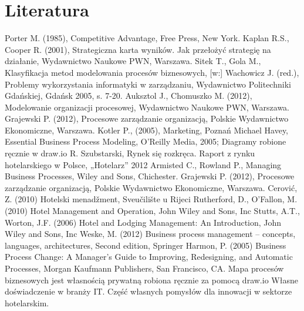 \documentclass[a4paper, 12pt]{article}
\begin{document}
\section{Literatura}
\begin{thebibliography}{}
	  Porter M. (1985), Competitive Advantage, Free Press, New York. 
	 Kaplan R.S., Cooper R. (2001), Strategiczna karta wyników. Jak przełożyć strategię na działanie, Wydawnictwo Naukowe PWN, Warszawa. 
	 Sitek  T.,  Gola  M.,  Klasyfikacja  metod  modelowania  procesów  biznesowych,  [w:] Wachowicz  J.  (red.),  Problemy  wykorzystania  informatyki  w  zarządzaniu,  Wydawnictwo Politechniki Gdańskiej, Gdańsk 2005, s. 7-20.
	 Auksztol J., Chomuszko M. (2012), Modelowanie organizacji procesowej,
Wydawnictwo Naukowe PWN, Warszawa. 
	 Grajewski P. (2012), Procesowe zarządzanie organizacją, Polskie Wydawnictwo Ekonomiczne, Warszawa. 
	 Kotler P., (2005), Marketing, Poznań
	 Michael Havey, Essential Business Process Modeling, O'Reilly Media, 2005;
	 Diagramy robione ręcznie w draw.io
	 R. Szubstarski, Rynek się rozkręca. Raport z rynku hotelarskiego w Polsce, „Hotelarz” 2012
	 Armisted C., Rowland P., Managing Business Processes, Wiley
and Sons, Chichester. 
	 Grajewski P. (2012), Procesowe zarządzanie organizacją, Polskie Wydawnictwo Ekonomiczne, Warszawa. 
	 Cerović, Z. (2010) Hotelski menadžment, Sveučilište u Rijeci
	 Rutherford, D., O’Fallon, M. (2010) Hotel Management and Operation, John Wiley and Sons, Inc
	 Stutts, A.T., Worton, J.F. (2006)  Hotel and Lodging  Management: An  Introduction, John Wiley and Sons, Inc
	 Weske,  M. (2012)  Business  process  management –  concepts,  languages,  architectures, Second edition, Springer
	 Harmon, P. (2005) Business Process Change: A Manager’s Guide to Improving, Redesigning, and Automatic Processes, Morgan Kaufmann Publishers, San Francisco, CA.
	 Mapa procesów biznesowych jest własnością prywatną robiona ręcznie za pomocą draw.io
	 Własne doświadczenie w branży IT.
	 Część własnych pomysłów dla innowacji w sektorze hotelarskim.	 
\end{thebibliography}
\label{LastPage}~
\label{LastPageOfBackMatter}~		
\end{document}

